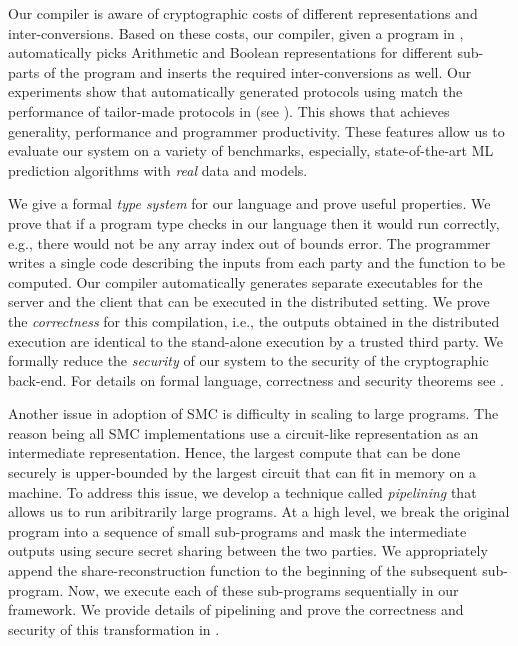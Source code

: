 Our compiler is aware of cryptographic costs of different representations and inter-conversions.  Based on these costs, our compiler, given a program in \tool, automatically picks Arithmetic and Boolean representations for different sub-parts of the program and inserts the required inter-conversions as well. 
Our experiments show that automatically generated protocols using \tool match the performance of tailor-made protocols in \cite{minionn,shafindss} (see ). This shows that  \tool achieves generality, performance and programmer productivity. These features allow us to evaluate our system on a variety of benchmarks, especially, state-of-the-art ML prediction algorithms with \emph{real} data and models. 

We give a formal {\em type system} for our language and prove useful properties. We prove that if a program type checks in our language then it would run correctly, e.g., there would not be any array index out of bounds error. The programmer writes a single code describing the inputs from each party and the function to be computed. Our compiler automatically generates separate executables for the server and the client that can be executed in the distributed setting. We prove the {\em correctness} for this compilation, i.e., the outputs obtained in the distributed execution are identical to the stand-alone execution by a trusted third party. We formally reduce the {\em security} of our system to the security of the cryptographic back-end. For details on formal language, correctness and security theorems see .

Another issue in adoption of SMC is difficulty in scaling to large programs. 
The reason being all SMC implementations use a circuit-like representation as an intermediate representation. Hence, the largest compute that can be done securely is upper-bounded by the largest circuit that can fit in memory on a machine. 
To address this issue, we develop a technique called \emph{pipelining} that allows us to run aribitrarily large programs. At a high level, we break the original program into a sequence of small sub-programs and mask the intermediate outputs using secure secret sharing between the two parties. We appropriately append the share-reconstruction function to the beginning of the subsequent sub-program. Now, we execute each of these sub-programs sequentially in our framework. We provide details of pipelining and prove the correctness and security of this transformation in .

